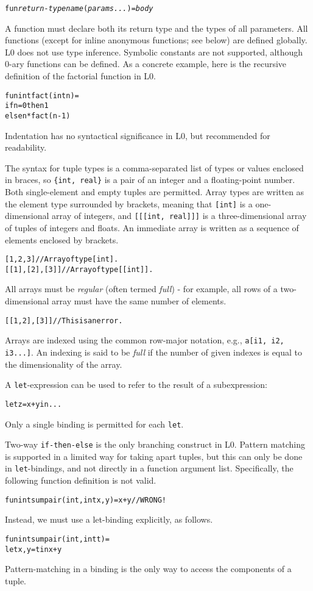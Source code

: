 \documentclass[oneside]{memoir}
\begin{document}
\begin{alltt}
  fun \textit{return-type} \textit{name}(\textit{params...}) = \textit{body}
\end{alltt}

A function must declare both its return type and the types of all
parameters.  All functions (except for inline anonymous functions; see
below) are defined globally.  L0 does not use type inference.
Symbolic constants are not supported, although 0-ary functions can be
defined.  As a concrete example, here is the recursive definition of
the factorial function in L0.
\begin{alltt}
  fun int fact(int n) =
    if n = 0 then 1
             else n * fact(n-1)
\end{alltt}
Indentation has no syntactical significance in L0, but recommended for
readability.

The syntax for tuple types is a comma-separated list of types or
values enclosed in braces, so \texttt{\{int, real\}} is a pair of an
integer and a floating-point number.  Both single-element and empty
tuples are permitted.  Array types are written as the element type
surrounded by brackets, meaning that \texttt{[int]} is a
one-dimensional array of integers, and \texttt{[[[{int, real}]]]} is a
three-dimensional array of tuples of integers and floats.  An
immediate array is written as a sequence of elements enclosed by
brackets.
\begin{alltt}
  [1, 2, 3]       // Array of type [int].
  [[1], [2], [3]] // Array of type [[int]].
\end{alltt}
All arrays must be \emph{regular} (often termed \emph{full}) - for
example, all rows of a two-dimensional array must have the same number
of elements.
\begin{alltt}
  [[1, 2], [3]] // This is an error.
\end{alltt}
Arrays are indexed using the common row-major notation, 
e.g., \texttt{a[i1, i2, i3...]}.  An indexing is said to be \textit{full} if
the number of given indexes is equal to the dimensionality of the
array.

A \texttt{let}-expression can be used to refer to the result of a
subexpression:
\begin{alltt}
  let z = x + y in ...
\end{alltt}
Only a single binding is permitted for each \texttt{let}.

Two-way \texttt{if-then-else} is the only branching construct in L0.
Pattern matching is supported in a limited way for taking apart
tuples, but this can only be done in \texttt{let}-bindings, and not
directly in a function argument list.  Specifically, the following
function definition is not valid.
\begin{alltt}
  fun int sumpair({int, int} {x, y}) = x + y // WRONG!
\end{alltt}
Instead, we must use a let-binding explicitly, as follows.
\begin{alltt}
  fun int sumpair({int, int} t) =
    let {x,y} = t in x + y
\end{alltt}
Pattern-matching in a binding is the only way to access the components
of a tuple.
\end{document}
